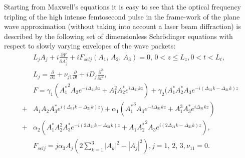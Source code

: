 \documentclass[a4paper, 12pt, onecolumn]{extarticle}
\begin{document}
Starting from Maxwell's equations it is easy to see that the optical frequency tripling of the  high intense femtosecond pulse in the frame-work of the plane wave approximation (without taking into account a laser beam diffraction) is described by the following set of dimensionless Schr\"{o}dinger equations with respect to slowly varying envelopes of the wave packets:
\begin{equation}
\label{eq:ref1}
\begin{aligned}
&L_jA_j+i\frac{\partial F}{\partial A_j^*}+iF_{selj}(A_1,\,A_2,\,A_3)=0,\,0< z \leq L_z , 0<t<L_t,\\
&L_j=\frac{\partial}{\partial z}+\nu_{j1}\frac{\partial}{\partial t}+iD_j\frac{\partial^2}{\partial t^2},\\
&F=\gamma_1({A_1^*}^2A_2e^{-i\Delta_{21} kz}+A_1^2A_2^*e^{i\Delta_{21} kz})+\gamma_2 (A_1^*A_2^* A_3e^{-i(\Delta_{31}k-\Delta_{21}k)z}\\
+&A_1A_2A_3^*e^{i(\Delta_{31}k-\Delta_{21}k)z})+\alpha_1({A_1^*}^3 A_3 e^{-i\Delta_{31}kz}+A_1^3 A_3^* e^{i\Delta_{31}kz})\\
+&\alpha_2(A_1^*A_2^2 A_3^*e^{-i(2\Delta_{21}k-\Delta_{31}k )z}+A_1{A_2^*}^2 A_3e^{i(2\Delta_{21}k-\Delta_{31}k )z}),\\
&F_{selj}=j\alpha_3 A_j(2\sum\limits_{k=1}^3 |A_k|^2-|A_j|^2), j=1,\,2,\,3, \nu_{11}=0.\\
\end{aligned}
\end{equation}
\end{document}
